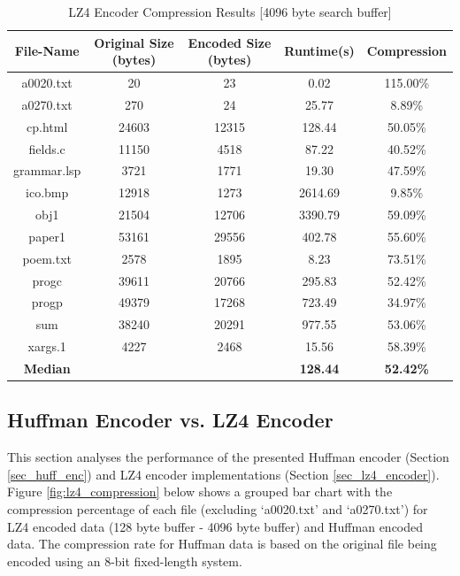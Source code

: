 \documentclass[12pt]{article}
\begin{document}
\begin{table}[H]
	\centering
	\begin{tabular}{| c | c | c | c | c |} 
		\hline
		File-Name & Original Size (bytes) & Encoded Size (bytes) & Runtime(s) & Compression\\
		\hline
		a0020.txt & 20 & 23 & 0.02 & 115.00\%\\\hline
		a0270.txt & 270 & 24 & 25.77 & 8.89\%\\\hline
		cp.html & 24603 & 12315 & 128.44 & 50.05\%\\\hline
		fields.c & 11150 & 4518 & 87.22 & 40.52\%\\\hline
		grammar.lsp & 3721 & 1771 & 19.30 & 47.59\%\\\hline
		ico.bmp & 12918 & 1273 & 2614.69 & 9.85\%\\\hline
		obj1 & 21504 & 12706 & 3390.79 & 59.09\%\\\hline
		paper1 & 53161 & 29556 & 402.78 & 55.60\%\\\hline
		poem.txt & 2578 & 1895 & 8.23 & 73.51\%\\\hline
		progc & 39611 & 20766 & 295.83 & 52.42\%\\\hline
		progp & 49379 & 17268 & 723.49 & 34.97\%\\\hline
		sum & 38240 & 20291 & 977.55 & 53.06\%\\\hline
		xargs.1 & 4227 & 2468 & 15.56 & 58.39\%\\
		\Xhline{3\arrayrulewidth}
		\textbf{Median} & & & \textbf{128.44} & \textbf{52.42\%}\\
		\hline
	\end{tabular}
	\caption{LZ4 Encoder Compression Results [4096 byte search buffer]}
	\label{lz4_enc_results4096}
\end{table}

\subsection{Huffman Encoder vs. LZ4 Encoder}
This section analyses the performance of the presented Huffman encoder (Section \ref{sec_huff_enc}) and LZ4 encoder implementations (Section \ref{sec_lz4_encoder}). Figure \ref{fig:lz4_compression} below shows a grouped bar chart with the compression percentage of each file (excluding `a0020.txt' and `a0270.txt') for LZ4 encoded data (128 byte buffer - 4096 byte buffer) and Huffman encoded data. The compression rate for Huffman data is based on the original file being encoded using an 8-bit fixed-length system. 
\end{document}
